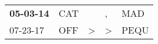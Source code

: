 \begin{supertabular}{p{0.07\textwidth}p{0.06\textwidth}p{0.02\textwidth}p{0.02\textwidth}p{0.06\textwidth}}
 \textbf{05-03-14\textsuperscript{}} &  CAT\textsuperscript{} &               &             , &   MAD\textsuperscript{} \\
          07-23-17\textsuperscript{} &  OFF\textsuperscript{} &  \textgreater &  \textgreater &  PEQU\textsuperscript{} \\
\end{supertabular}
